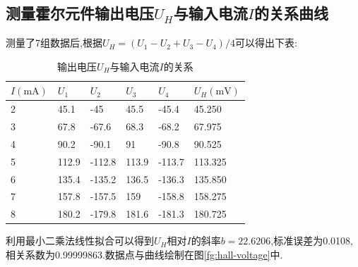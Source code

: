 \documentclass[UTF8,a4paper]{article}%
\begin{document}
\subsection{测量霍尔元件输出电压$U_H$与输入电流$I$的关系曲线}
测量了7组数据后,根据$U_H=(U_1-U_2+U_3-U_4)/4$可以得出下表:
\begin{table}[H]
    \centering
    \caption{输出电压$U_H$与输入电流$I$的关系}
    \begin{tabular}{l|llll|l}
        \hline
        $I(\unit{\mA})$ & $U_1$ & $U_2$  & $U_3$ & $U_4$  & $U_H(\unit{\mV})$ \\ \hline
        2               & 45.1  & -45    & 45.5  & -45.4  & 45.250            \\
        3               & 67.8  & -67.6  & 68.3  & -68.2  & 67.975            \\
        4               & 90.2  & -90.1  & 91    & -90.8  & 90.525            \\
        5               & 112.9 & -112.8 & 113.9 & -113.7 & 113.325           \\
        6               & 135.4 & -135.2 & 136.5 & -136.3 & 135.850           \\
        7               & 157.8 & -157.5 & 159   & -158.8 & 158.275           \\
        8               & 180.2 & -179.8 & 181.6 & -181.3 & 180.725           \\ \hline
    \end{tabular}
\end{table}
利用最小二乘法线性拟合可以得到$U_H$相对$I$的斜率$b=22.6206$,标准误差为0.0108,相关系数为0.99999863.数据点与曲线绘制在图\ref{fg:hall-voltage}中.
\end{document}
